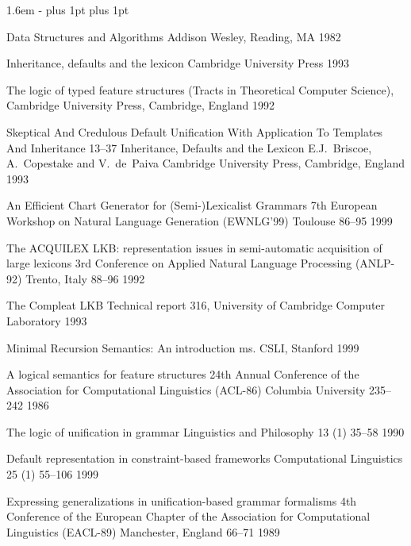 \documentclass[12pt]{report}
\begin{document}
\begin{list}{}
   {\leftmargin 1.6em
    \itemindent -\leftmargin
    \itemsep 0pt plus 1pt
    \parsep 0pt plus 1pt}

{Data Structures and Algorithms}
{Addison Wesley, Reading, MA}
{1982}

{Inheritance, defaults and the lexicon}
{Cambridge University Press}
{1993}

{The logic of typed feature structures}
{(Tracts in Theoretical Computer Science), Cambridge University Press,
  Cambridge, England} 
{1992}

           {Skeptical And Credulous Default Unification With
Application To Templates And Inheritance}
    {13--37}
    {Inheritance, Defaults and the Lexicon}
    {E.J.~Briscoe, A.~Copestake and V.~de~Paiva}
    {Cambridge University Press, Cambridge, England}
    {1993}

{An Efficient Chart Generator for (Semi-)Lexicalist Grammars}
{7th European Workshop on Natural Language
Generation (EWNLG'99)}
{Toulouse} 
{86--95}
{1999}

{The ACQUILEX LKB: representation issues in semi-automatic
acquisition of large lexicons}
{3rd Conference on Applied Natural Language Processing (ANLP-92)}
{Trento, Italy}
{88--96}
{1992}

{The Compleat LKB}
{Technical report 316,
University of Cambridge Computer Laboratory}
{1993}

{Minimal Recursion Semantics: An introduction}
{ms. CSLI, Stanford}
{1999}

{A logical semantics for feature structures}
{24th Annual Conference of the Association for Computational
Linguistics (ACL-86)}
{Columbia University}
{235--242}
{1986}

{The logic of unification in grammar}
{Linguistics and Philosophy}
{13 (1)}
{35--58}
{1990}

{Default representation in constraint-based frameworks}
{Computational Linguistics}
{25 (1)}
{55--106}
{1999}

  {Expressing generalizations in unification-based grammar formalisms}
  {4th Conference of the European Chapter of the Association 
for Computational Linguistics (EACL-89)}
  {Manchester, England}
  {66--71}
  {1989}


\end{list}
\end{document}
